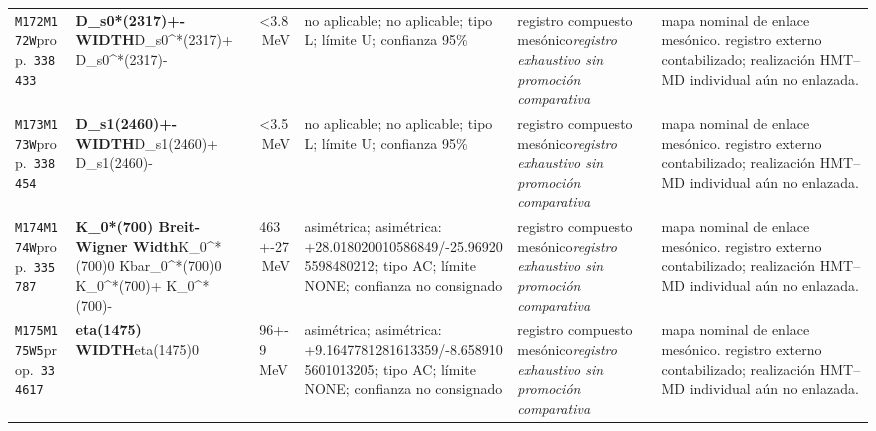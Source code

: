 \begin{landscape}
\begin{longtable}{L{1.85cm}L{4.45cm}L{2.35cm}L{4.05cm}L{3.35cm}L{7.15cm}}
\texttt{M172}\newline \texttt{M172W}\newline prop.\ \texttt{338433} & \textbf{D\_\allowbreak{}s0*(2317)+- WIDTH}\newline D\_\allowbreak{}s0\textasciicircum{}*(2317)+ \textbar{}\allowbreak{} D\_\allowbreak{}s0\textasciicircum{}*(2317)- & \textless{}3.8\,MeV & no aplicable; no aplicable; tipo L; límite U; confianza 95\% & registro compuesto mesónico\newline \emph{registro exhaustivo sin promoción comparativa} & mapa nominal de enlace mesónico. registro externo contabilizado; realización HMT--MD individual aún no enlazada. \\
\texttt{M173}\newline \texttt{M173W}\newline prop.\ \texttt{338454} & \textbf{D\_\allowbreak{}s1(2460)+- WIDTH}\newline D\_\allowbreak{}s1(2460)+ \textbar{}\allowbreak{} D\_\allowbreak{}s1(2460)- & \textless{}3.5\,MeV & no aplicable; no aplicable; tipo L; límite U; confianza 95\% & registro compuesto mesónico\newline \emph{registro exhaustivo sin promoción comparativa} & mapa nominal de enlace mesónico. registro externo contabilizado; realización HMT--MD individual aún no enlazada. \\
\texttt{M174}\newline \texttt{M174W}\newline prop.\ \texttt{335787} & \textbf{K\_\allowbreak{}0*(700) Breit-Wigner Width}\newline K\_\allowbreak{}0\textasciicircum{}*(700)0 \textbar{}\allowbreak{} Kbar\_\allowbreak{}0\textasciicircum{}*(700)0 \textbar{}\allowbreak{} K\_\allowbreak{}0\textasciicircum{}*(700)+ \textbar{}\allowbreak{} K\_\allowbreak{}0\textasciicircum{}*(700)- & 463+-27\,MeV & asimétrica; asimétrica: +28.018020010586849/-25.969205598480212; tipo AC; límite NONE; confianza no consignado & registro compuesto mesónico\newline \emph{registro exhaustivo sin promoción comparativa} & mapa nominal de enlace mesónico. registro externo contabilizado; realización HMT--MD individual aún no enlazada. \\
\texttt{M175}\newline \texttt{M175W5}\newline prop.\ \texttt{334617} & \textbf{eta(1475) WIDTH}\newline eta(1475)0 & 96+-9\,MeV & asimétrica; asimétrica: +9.1647781281613359/-8.6589105601013205; tipo AC; límite NONE; confianza no consignado & registro compuesto mesónico\newline \emph{registro exhaustivo sin promoción comparativa} & mapa nominal de enlace mesónico. registro externo contabilizado; realización HMT--MD individual aún no enlazada. \\

\end{longtable}
\end{landscape}

